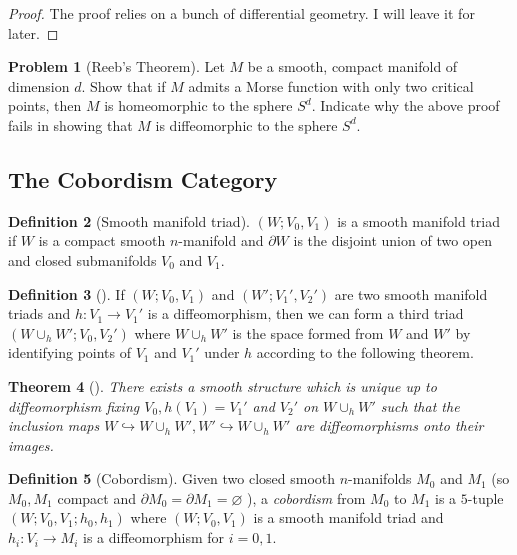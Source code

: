 \documentclass[reqno]{amsart}
\newtheorem{theorem}{Theorem}[section]
\theoremstyle{definition}
\newtheorem{definition}[theorem]{Definition}
\newtheorem{problem}[theorem]{Problem}
\theoremstyle{remark}
\begin{document}
    \begin{proof}
        The proof relies on a bunch of differential geometry.
        I will leave it for later.
    \end{proof}

    \begin{problem}[Reeb's Theorem]
        Let $M$ be a smooth, compact manifold
        of dimension $d$. Show that if $M$ admits
        a Morse function with only two critical points, then
        $M$ is homeomorphic to the sphere $S^{d}$. Indicate
        why the above proof fails in showing that $M$ is
        diffeomorphic to the sphere $S^{d}$.
    \end{problem}

    

    \subsection{The Cobordism Category}

    \begin{definition}[Smooth manifold triad]
        $\left( W; V_0,V_1 \right) $ is a smooth
        manifold triad if $W$ is a compact
        smooth $n$-manifold and $\partial W$ is the disjoint
        union of two open and closed submanifolds
        $V_0$ and $V_1$.
    \end{definition}

    \begin{definition}[]
        If $\left( W; V_0,V_1 \right) $ and
        $\left( W'; V_1', V_2' \right) $ are two
        smooth manifold triads and
        $h \colon V_1 \to V_1'$ is a diffeomorphism,
        then we can form a third triad
        $\left( W \cup_h W'; V_0, V_2' \right) $ where
        $W \cup_h W'$ is the space formed from
        $W$ and $W'$ by identifying points of
        $V_1$ and $V_1'$ under $h$ according to the
        following theorem.
    \end{definition}

    \begin{theorem}[]\label{sm-structure-cobordism-composition}
        There exists a smooth structure which is unique
        up to diffeomorphism fixing $V_0, h(V_1) = V_1'$ and
        $V_2'$ on
        $W \cup_h W'$  such that
        the inclusion maps
        $W \hookrightarrow W \cup_h W',
        W' \hookrightarrow W\cup_h W'$ are diffeomorphisms
        onto their images.
    \end{theorem}

    \begin{definition}[Cobordism]
        Given two closed smooth $n$-manifolds
        $M_0$ and $M_1$ (so $M_0,M_1$ compact and
        $\partial M_0 = \partial M_1 = \varnothing$ ),
        a \textit{cobordism} from
        $M_0$ to $M_1$ is a $5$-tuple
        $\left( W; V_0, V_1; h_0 , h_1 \right) $ where
        $\left( W; V_0, V_1 \right) $ is a smooth
        manifold triad and 
        $h_i \colon V_i \to M_i$ is a diffeomorphism for
        $i = 0,1$.
    \end{definition}
\end{document}
